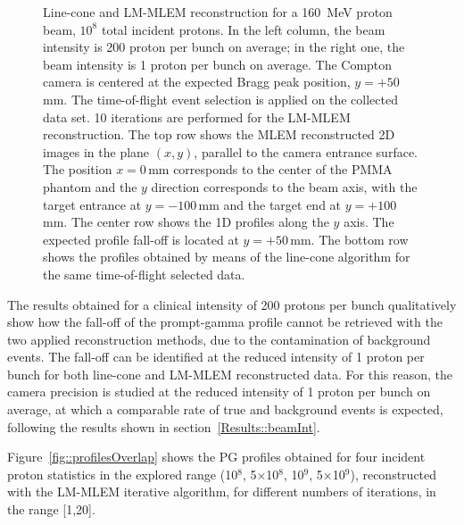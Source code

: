 \begin{figure}
\caption{Line-cone and LM-MLEM reconstruction for a 160~MeV proton beam, $10^{8}$ total incident protons. In the left column, the beam intensity is 200 proton per bunch on average; in the right one, the beam intensity is 1 proton per bunch on average. The Compton camera is centered at the expected Bragg peak position, $y=+50\,$mm. The time-of-flight event selection is applied on the collected data set. 10 iterations are performed for the LM-MLEM reconstruction. The top row shows the MLEM reconstructed 2D images in the plane $(x,y)$, parallel to the camera entrance surface. The position $x=0\,$mm corresponds to the center of the PMMA phantom and the $y$ direction corresponds to the beam axis, with the target entrance at $y=-100\,$mm and the target end at $y=+100\,$mm.  The center row shows the 1D profiles along the $y$ axis. The expected profile fall-off is located at $y=+50\,$mm. The bottom row shows the profiles obtained by means of the line-cone algorithm for the same time-of-flight selected data.}
\label{fig:comparison}
\end{figure}

The results obtained for a clinical intensity of 200 protons per bunch qualitatively show how the fall-off of the prompt-gamma profile cannot be retrieved with the two applied reconstruction methods, due to the contamination of background events. The fall-off can be identified at the reduced intensity of 1 proton per bunch for both line-cone and LM-MLEM reconstructed data.
For this reason, the camera precision is studied at the reduced intensity of 1 proton per bunch on average, at which a comparable rate of true and background events is expected, following the results shown in section~\ref{Results::beamInt}.

Figure~\ref{fig::profilesOverlap} shows the PG profiles obtained for four incident proton statistics in the explored range (10$^{8}$, 5$\times$10$^{8}$, 10$^{9}$, 5$\times$10$^{9}$), reconstructed with the LM-MLEM iterative algorithm, for different numbers of iterations, in the range [1,20].

